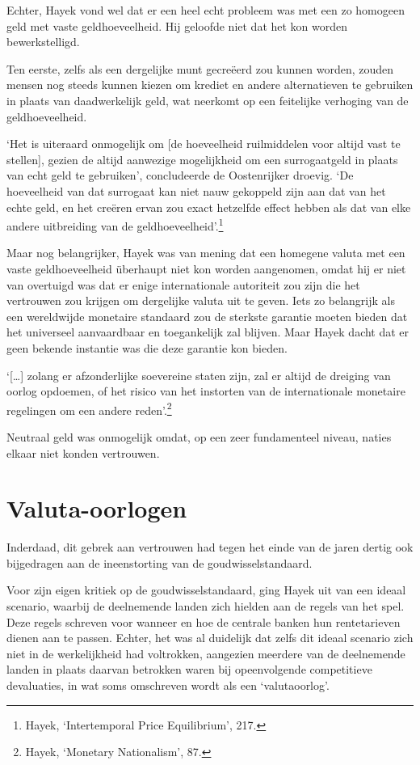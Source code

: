 \documentclass[smalldemyvopaper,11pt,twoside,onecolumn,openright,extrafontsizes,hidelinks]{memoir}
\begin{document}
Echter, Hayek vond wel dat er een heel echt probleem was met een zo
homogeen geld met vaste geldhoeveelheid. Hij geloofde niet dat het kon
worden bewerkstelligd.

Ten eerste, zelfs als een dergelijke munt gecreëerd zou kunnen worden,
zouden mensen nog steeds kunnen kiezen om krediet en andere
alternatieven te gebruiken in plaats van daadwerkelijk geld, wat
neerkomt op een feitelijke verhoging van de geldhoeveelheid.

`Het is uiteraard onmogelijk om {[}de hoeveelheid ruilmiddelen voor
altijd vast te stellen{]}, gezien de altijd aanwezige mogelijkheid om
een surrogaatgeld in plaats van echt geld te gebruiken', concludeerde de
Oostenrijker droevig. `De hoeveelheid van dat surrogaat kan niet nauw
gekoppeld zijn aan dat van het echte geld, en het creëren ervan zou
exact hetzelfde effect hebben als dat van elke andere uitbreiding van de
geldhoeveelheid'.\footnote{\hspace{0pt}Hayek, `Intertemporal Price
  Equilibrium', 217.}

Maar nog belangrijker, Hayek was van mening dat een homegene valuta met
een vaste geldhoeveelheid überhaupt niet kon worden aangenomen, omdat
hij er niet van overtuigd was dat er enige internationale autoriteit zou
zijn die het vertrouwen zou krijgen om dergelijke valuta uit te geven.
Iets zo belangrijk als een wereldwijde monetaire standaard zou de
sterkste garantie moeten bieden dat het universeel aanvaardbaar en
toegankelijk zal blijven. Maar Hayek dacht dat er geen bekende instantie
was die deze garantie kon bieden.

`{[}\ldots{]} zolang er afzonderlijke soevereine staten zijn, zal er
altijd de dreiging van oorlog opdoemen, of het risico van het instorten
van de internationale monetaire regelingen om een andere
reden'.\footnote{\hspace{0pt}Hayek, `Monetary Nationalism', 87.}

Neutraal geld was onmogelijk omdat, op een zeer fundamenteel niveau,
naties elkaar niet konden vertrouwen.

\section{Valuta-oorlogen}\label{valuta-oorlogen}

Inderdaad, dit gebrek aan vertrouwen had tegen het einde van de jaren
dertig ook bijgedragen aan de ineenstorting van de goudwisselstandaard.

Voor zijn eigen kritiek op de goudwisselstandaard, ging Hayek uit van
een ideaal scenario, waarbij de deelnemende landen zich hielden aan de
regels van het spel. Deze regels schreven voor wanneer en hoe de
centrale banken hun rentetarieven dienen aan te passen. Echter, het was
al duidelijk dat zelfs dit ideaal scenario zich niet in de werkelijkheid
had voltrokken, aangezien meerdere van de deelnemende landen in plaats
daarvan betrokken waren bij opeenvolgende competitieve devaluaties, in
wat soms omschreven wordt als een `valutaoorlog'.
\end{document}
